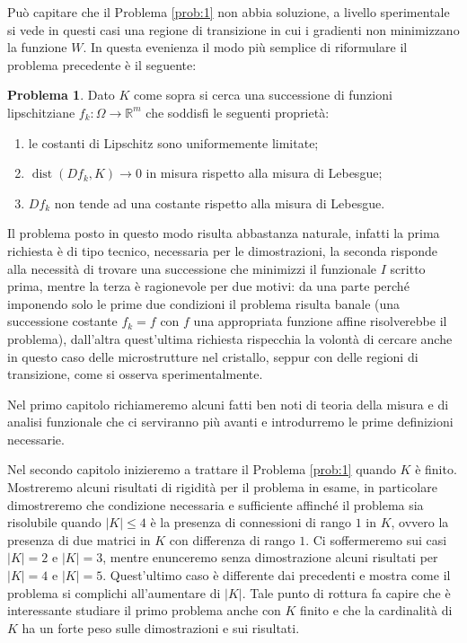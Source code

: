 \documentclass[a4paper,11pt]{book}
\theoremstyle{plain}
\theoremstyle{definition}
\newtheorem{prob}{Problema}
\theoremstyle{remark}
\newcommand{\R}{\mathbb{R}}
\DeclareMathOperator{\dist}{dist}
\begin{document}
Può capitare che il Problema \ref{prob:1} non abbia soluzione, a livello sperimentale si vede in questi casi una regione di transizione in cui i gradienti non minimizzano la funzione $W$. In questa evenienza il modo più semplice di riformulare il problema precedente è il seguente:
\begin{prob}\label{prob:2}
	Dato $K$ come sopra si cerca una successione di funzioni lipschitziane $f_k:\Omega\to\R^m$ che soddisfi le seguenti proprietà:
	\begin{enumerate}
		\item le costanti di Lipschitz sono uniformemente limitate;
		\item $\dist(Df_k,K)\to 0$ in misura rispetto alla misura di Lebesgue;
		\item $Df_{k}$ non tende ad una costante rispetto alla misura di Lebesgue.
	\end{enumerate}
\end{prob}
Il problema posto in questo modo risulta abbastanza naturale, infatti la prima richiesta è di tipo tecnico, necessaria per le dimostrazioni, la seconda risponde alla necessità di trovare una successione che minimizzi il funzionale $I$ scritto prima, mentre la terza è ragionevole per due motivi: da una parte perché imponendo solo le prime due condizioni il problema risulta banale (una successione costante $f_{k}=f$ con $f$ una appropriata funzione affine risolverebbe il problema), dall'altra quest'ultima richiesta rispecchia la volontà di cercare anche in questo caso delle microstrutture nel cristallo, seppur con delle regioni di transizione, come si osserva sperimentalmente.

Nel primo capitolo richiameremo alcuni fatti ben noti di teoria della misura e di analisi funzionale che ci serviranno più avanti e introdurremo le prime definizioni necessarie.

Nel secondo capitolo inizieremo a trattare il Problema \ref{prob:1} quando $K$ è finito. Mostreremo alcuni risultati di rigidità per il problema in esame, in particolare dimostreremo che condizione necessaria e sufficiente affinché il problema sia risolubile quando $|K|\leq 4$ è la presenza di connessioni di rango $1$ in $K$, ovvero la presenza di due matrici in $K$ con differenza di rango $1$. Ci soffermeremo sui casi $|K|=2$ e $|K|=3$, mentre enunceremo senza dimostrazione alcuni risultati per $|K|=4$ e $|K|=5$. Quest'ultimo caso è differente dai precedenti e mostra come il problema si complichi all'aumentare di $|K|$. Tale punto di rottura fa capire che è interessante studiare il primo problema anche con $K$ finito e che la cardinalità di $K$ ha un forte peso sulle dimostrazioni e sui risultati.
\end{document}
